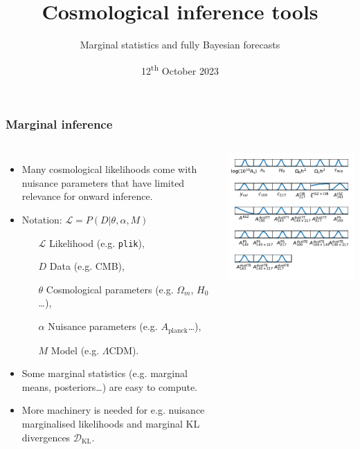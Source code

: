 \documentclass[aspectratio=169]{beamer}
\title{Cosmological inference tools}
\subtitle{Marginal statistics and fully Bayesian forecasts}
\date{12\textsuperscript{th} October 2023}
\begin{document}
\begin{frame}
    \titlepage
\end{frame}

\begin{frame}
    \frametitle{Marginal inference}
    \begin{columns}
        \begin{itemize}
            \item Many cosmological likelihoods come with nuisance parameters that have limited relevance for onward inference.
            \item Notation: $\mathcal{L} = P(D|\theta,\alpha,M)$
                \begin{itemize}
                    \item[$\mathcal{L}$] Likelihood \hfill (e.g. \texttt{plik}),
                    \item[$D$] Data \hfill (e.g. CMB),
                    \item[$\theta$] Cosmological parameters \hfill (e.g. $\Omega_m$, $H_0$\ldots),
                    \item[$\alpha$] Nuisance parameters \hfill (e.g. $A_\text{planck}$\ldots),
                    \item[$M$] Model \hfill (e.g. $\Lambda$CDM).
                \end{itemize}
            \item Some marginal statistics (e.g. marginal means, posteriors\ldots) are easy to compute.
            \item More machinery is needed for e.g. nuisance marginalised likelihoods and marginal KL divergences $\mathcal{D}_\text{KL}$.
        \end{itemize}
        \includegraphics{figures/planck_2018_plik.pdf}
    \end{columns}
\end{frame}
\end{document}

